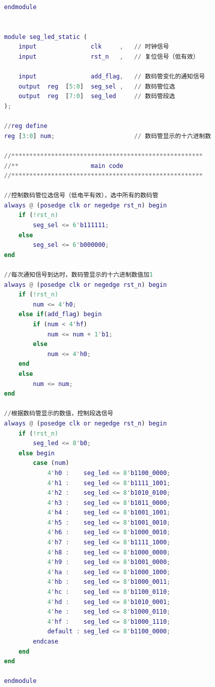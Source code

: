 \documentclass[UTF8]{article}
\theoremstyle{MyLineTheoremStyle} %
\theoremstyle{MyBlockTheoremStyle} %
\theoremstyle{MySubsubsectionStyle} %
\begin{document}
\begin{lstlisting}[language=Matlab, style=MatlabStyle_src]
endmodule 


module seg_led_static (
    input               clk     ,   // 时钟信号
    input               rst_n   ,   // 复位信号（低有效）

    input               add_flag,   // 数码管变化的通知信号
    output  reg  [5:0]  seg_sel ,   // 数码管位选
    output  reg  [7:0]  seg_led     // 数码管段选
);

//reg define
reg [3:0] num;                      // 数码管显示的十六进制数

//*****************************************************
//**                    main code
//*****************************************************

//控制数码管位选信号（低电平有效），选中所有的数码管
always @ (posedge clk or negedge rst_n) begin
    if (!rst_n)
        seg_sel <= 6'b111111;
    else
        seg_sel <= 6'b000000;
end

//每次通知信号到达时，数码管显示的十六进制数值加1
always @ (posedge clk or negedge rst_n) begin
    if (!rst_n)
        num <= 4'h0;
    else if(add_flag) begin
        if (num < 4'hf)
            num <= num + 1'b1;
        else
            num <= 4'h0;
    end
    else
        num <= num;
end

//根据数码管显示的数值，控制段选信号
always @ (posedge clk or negedge rst_n) begin
    if (!rst_n)
        seg_led <= 8'b0;
    else begin
        case (num)
            4'h0 :    seg_led <= 8'b1100_0000;
            4'h1 :    seg_led <= 8'b1111_1001;
            4'h2 :    seg_led <= 8'b1010_0100;
            4'h3 :    seg_led <= 8'b1011_0000;
            4'h4 :    seg_led <= 8'b1001_1001;
            4'h5 :    seg_led <= 8'b1001_0010;
            4'h6 :    seg_led <= 8'b1000_0010;
            4'h7 :    seg_led <= 8'b1111_1000;
            4'h8 :    seg_led <= 8'b1000_0000;
            4'h9 :    seg_led <= 8'b1001_0000;
            4'ha :    seg_led <= 8'b1000_1000;
            4'hb :    seg_led <= 8'b1000_0011;
            4'hc :    seg_led <= 8'b1100_0110;
            4'hd :    seg_led <= 8'b1010_0001;
            4'he :    seg_led <= 8'b1000_0110;
            4'hf :    seg_led <= 8'b1000_1110;
            default : seg_led <= 8'b1100_0000;
        endcase
    end
end

endmodule 
\end{lstlisting}

\cleardoublepage
\end{document}
